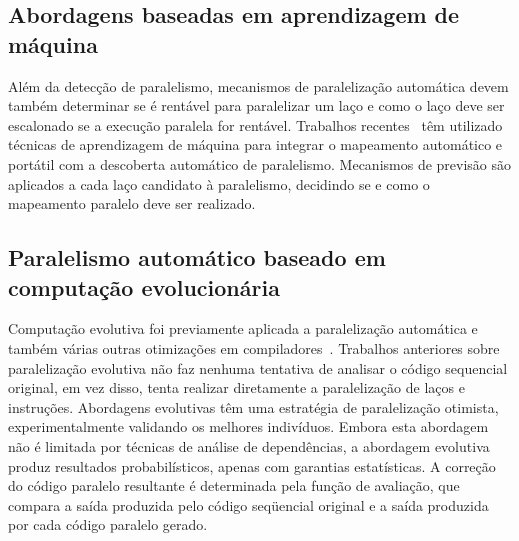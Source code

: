 \documentclass[a4paper,12pt]{article}
\begin{document}
\subsection{Abordagens baseadas em aprendizagem de máquina}

Além da detecção de paralelismo, mecanismos de paralelização automática devem também determinar se é rentável para paralelizar um laço e como o laço deve ser escalonado se a execução paralela for rentável. Trabalhos recentes~\cite{wang09,tournavitis09,wang14a} têm utilizado técnicas de aprendizagem de máquina para integrar o mapeamento automático e portátil com a descoberta automático de paralelismo. Mecanismos de previsão são aplicados a cada laço candidato à paralelismo, decidindo se e como o mapeamento paralelo deve ser realizado.


\subsection{Paralelismo automático baseado em computação evolucionária}

Computação evolutiva foi previamente aplicada a paralelização automática e também várias outras otimizações em compiladores~\cite{walsh95,walsh96,williams96,williams99,schulte14a}. Trabalhos anteriores sobre paralelização evolutiva não faz nenhuma tentativa de analisar o código sequencial original, em vez disso, tenta realizar diretamente a paralelização de laços e instruções. Abordagens evolutivas têm uma estratégia de paralelização otimista, experimentalmente validando os melhores indivíduos. Embora esta abordagem não é limitada por técnicas de análise de dependências, a abordagem evolutiva produz resultados probabilísticos, apenas com garantias estatísticas. A correção do código paralelo resultante é determinada pela função de avaliação, que compara a saída produzida pelo código seqüencial original e a saída produzida por cada código paralelo gerado.
\end{document}
